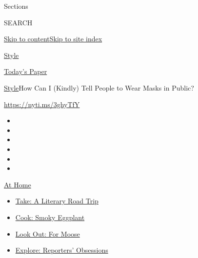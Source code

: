 Sections

SEARCH

\protect\hyperlink{site-content}{Skip to
content}\protect\hyperlink{site-index}{Skip to site index}

\href{https://www.nytimes3xbfgragh.onion/section/style}{Style}

\href{https://myaccount.nytimes3xbfgragh.onion/auth/login?response_type=cookie\&client_id=vi}{}

\href{https://www.nytimes3xbfgragh.onion/section/todayspaper}{Today's
Paper}

\href{/section/style}{Style}\textbar{}How Can I (Kindly) Tell People to
Wear Masks in Public?

\url{https://nyti.ms/3ghyTfY}

\begin{itemize}
\item
\item
\item
\item
\item
\item
\end{itemize}

\href{https://www.nytimes3xbfgragh.onion/spotlight/at-home?action=click\&pgtype=Article\&state=default\&region=TOP_BANNER\&context=at_home_menu}{At
Home}

\begin{itemize}
\tightlist
\item
  \href{https://www.nytimes3xbfgragh.onion/2020/07/28/books/time-for-a-literary-road-trip.html?action=click\&pgtype=Article\&state=default\&region=TOP_BANNER\&context=at_home_menu}{Take:
  A Literary Road Trip}
\item
  \href{https://www.nytimes3xbfgragh.onion/2020/07/29/magazine/bored-with-your-home-cooking-some-smoky-eggplant-will-fix-that.html?action=click\&pgtype=Article\&state=default\&region=TOP_BANNER\&context=at_home_menu}{Cook:
  Smoky Eggplant}
\item
  \href{https://www.nytimes3xbfgragh.onion/2020/07/27/travel/moose-michigan-isle-royale.html?action=click\&pgtype=Article\&state=default\&region=TOP_BANNER\&context=at_home_menu}{Look
  Out: For Moose}
\item
  \href{https://www.nytimes3xbfgragh.onion/interactive/2020/at-home/even-more-reporters-editors-diaries-lists-recommendations.html?action=click\&pgtype=Article\&state=default\&region=TOP_BANNER\&context=at_home_menu}{Explore:
  Reporters' Obsessions}
\end{itemize}

